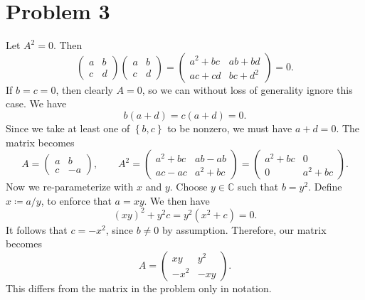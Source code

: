 \documentclass[11pt, letterpaper]{article}
\begin{document}
\section*{Problem 3}

Let $A^2=0$. Then
\[
	\begin{pmatrix}
	a & b \\
	c & d
	\end{pmatrix}\begin{pmatrix}
	a & b \\
	c & d
	\end{pmatrix}=\begin{pmatrix}
	a^2+bc & ab+bd \\
	ac+cd & bc+d^2
	\end{pmatrix}=0
.\]
If $b=c=0$, then clearly $A=0$, so we can without loss of generality ignore this case. We have
\[
	b(a+d)=c(a+d)=0
.\]
Since we take at least one of $\left\{ b,c \right\} $ to be nonzero, we must have $a+d=0$. The matrix becomes
\[
	A=\begin{pmatrix}
	a & b \\
	c & -a
	\end{pmatrix},\qquad A^2=\begin{pmatrix}
	a^2+bc & ab-ab \\
	ac-ac & a^2+bc
	\end{pmatrix}=\begin{pmatrix}
	a^2+bc & 0 \\
	0 & a^2+bc
	\end{pmatrix}
.\]
Now we re-parameterize with $x$ and $y$. Choose $y\in\mathbb{C} $ such that $b=y^2$. Define $x\coloneqq a/y$, to enforce that $a=xy$. We then have
\[
	\left( xy \right)^2+y^2c=y^2\left( x^2+c \right) =0
.\]
It follows that $c=-x^2$, since $b\neq 0$ by assumption. Therefore, our matrix becomes
\[
	A=\begin{pmatrix}
	xy & y^2 \\
	-x^2 & -xy
	\end{pmatrix}
.\]
This differs from the matrix in the problem only in notation.
\end{document}
